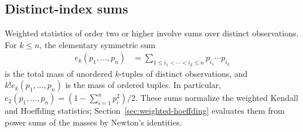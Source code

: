 \subsection{Distinct-index sums}
\label{subsec:distinct-index-sums}

Weighted statistics of order two or higher involve sums over distinct
observations. For $k\leq n$, the elementary symmetric sum
\begin{align*}
    e_k(p_1,\ldots,p_n)
    &= \sum_{1\leq i_1<\cdots<i_k\leq n} p_{i_1}\cdots p_{i_k}
\end{align*}
is the total mass of unordered $k$-tuples of distinct observations, and
$k!e_k(p_1,\ldots,p_n)$ is the mass of ordered tuples. In particular,
$e_2(p_1,\ldots,p_n) = (1-\sum_{i=1}^n p_i^2)/2$. These sums normalize the
weighted Kendall and Hoeffding statistics;
Section~\ref{sec:weighted-hoeffding} evaluates them from power sums of the
masses by Newton's identities.
